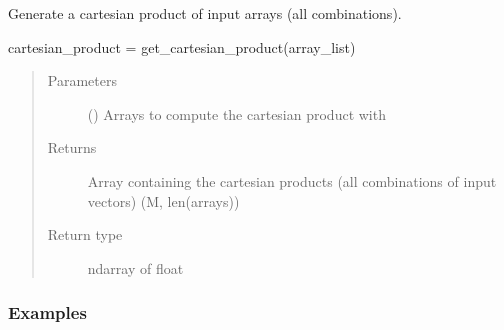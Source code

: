 \documentclass[letterpaper,10pt,english,openany,oneside]{sphinxmanual}
\begin{document}
\begin{fulllineitems}
\label{\detokenize{pygpc:pygpc.misc.get_cartesian_product}}
Generate a cartesian product of input arrays (all combinations).

cartesian\_product = get\_cartesian\_product(array\_list)
\begin{quote}\begin{description}
\item[{Parameters}] \leavevmode
{} () \textendash{} Arrays to compute the cartesian product with

\item[{Returns}] \leavevmode
{} \textendash{} Array containing the cartesian products (all combinations of input vectors)
(M, len(arrays))

\item[{Return type}] \leavevmode
ndarray of float

\end{description}\end{quote}
\subsubsection*{Examples}

%
\begin{sphinxVerbatim}[commandchars=\\\{\}]
 
  \PYG{p}{[}  \PYG{p}{]} \PYG{p}{[} \PYG{p}{]} \PYG{p}{[} \PYG{p}{]}
\end{sphinxVerbatim}

\end{fulllineitems}

\end{document}
